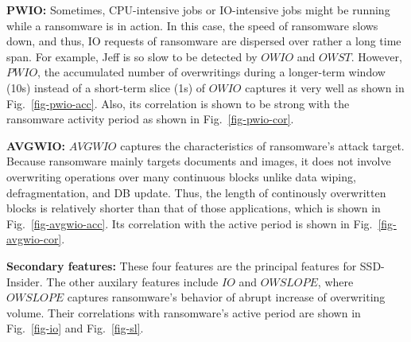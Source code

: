 \documentclass[conference]{IEEEtran}
\newcommand{\ours}{SSD-Insider}
\begin{document}
{\noindent\bf PWIO:} Sometimes, CPU-intensive jobs or IO-intensive jobs might be running 
while a ransomware is in action.
In this case, the speed of ransomware slows down, and thus, 
IO requests of ransomware are dispersed over 
rather a long time span. For example, Jeff is so slow to be detected by $OWIO$ and $OWST$.
However, $PWIO$, the accumulated number of overwritings 
during a longer-term window (10s) instead of a short-term slice (1s) of $OWIO$ 
captures it very well as shown in Fig.~\ref{fig-pwio-acc}. Also, its correlation is 
shown to be strong with the ransomware activity period as shown in Fig.~\ref{fig-pwio-cor}.

{\noindent\bf AVGWIO:} $AVGWIO$ captures the characteristics of ransomware's attack target. 
Because ransomware mainly targets documents and images, 
it does not involve overwriting operations
over many continuous blocks unlike data wiping, defragmentation, and DB update.  
Thus, the length of continously overwritten blocks is relatively shorter than that of those applications, which is shown in Fig.~\ref{fig-avgwio-acc}. Its correlation with the active 
period is shown in Fig.~\ref{fig-avgwio-cor}.

{\noindent\bf Secondary features:} These four features are the principal features for \ours{}.
The other auxilary features include $IO$ and $OWSLOPE$, 
where $OWSLOPE$ captures ransomware's behavior of abrupt increase of overwriting volume.
Their correlations with ransomware's active period are shown in Fig.~\ref{fig-io} and
Fig.~\ref{fig-sl}.
\end{document}
